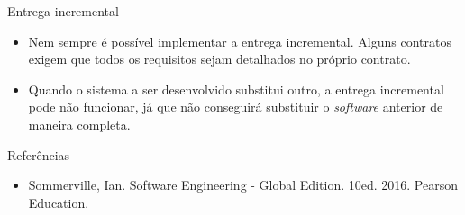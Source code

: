 \documentclass[11pt]{beamer}
\begin{document}
   \begin{frame}{Entrega incremental}
      \begin{itemize}
         \item Nem sempre é possível implementar a entrega incremental. Alguns contratos exigem que todos os requisitos sejam detalhados no próprio contrato.
         \item Quando o sistema a ser desenvolvido substitui outro, a entrega incremental pode não funcionar, já que não conseguirá substituir o \textit{software} anterior de maneira completa.
      \end{itemize}
   \end{frame}  

   \begin{frame}{Referências}
      \begin{itemize}
         \item Sommerville, Ian. Software Engineering - Global Edition. 10ed. 2016. Pearson Education. 
      \end{itemize}
   \end{frame}
\end{document}
